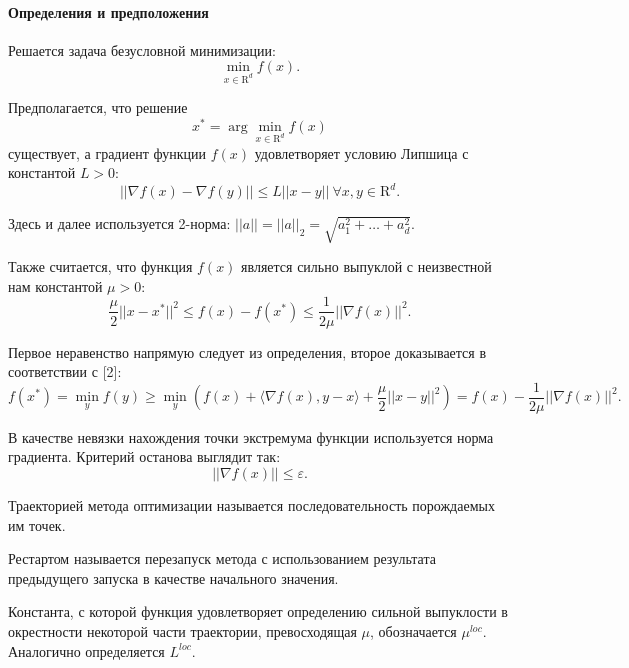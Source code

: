 \documentclass{crm-article}
\begin{document}
\paragraph{Определения и предположения}

Решается задача безусловной минимизации:
\begin{equation}
\min_{x\in \mathrm{R}^d} f(x).
\end{equation}

Предполагается, что решение
\begin{equation}
x^*=\arg\min_{x\in \mathrm{R}^d} f(x)
\end{equation}
существует, а градиент функции $f(x)$ удовлетворяет условию Липшица с константой $L>0$:
\begin{equation}
||\nabla f(x) - \nabla f(y)||\leq L||x-y||\ \forall x,y\in \mathrm{R}^d.
\end{equation}

Здесь и далее используется 2-норма: $||a||=||a||_2=\sqrt{a_1^2+\ldots+a_d^2}.$

Также считается, что функция $f(x)$ является сильно выпуклой с неизвестной нам константой $\mu>0$:
\begin{equation}
\frac{\mu}{2}||x-x^*||^2\leq f(x)-f(x^*)\leq \frac{1}{2\mu}||\nabla f(x)||^2.
\end{equation}


Первое неравенство напрямую следует из определения, второе доказывается в соответствии с [2]:
$$f(x^*) = \min_{y} f(y)\geq \min_y \left(f(x) + \langle \nabla f(x), y-x\rangle + \dfrac{\mu}{2} ||x-y||^2\right) = f(x) - \dfrac{1}{2\mu} ||\nabla f(x)||^2.$$

В качестве невязки нахождения точки экстремума функции используется норма градиента. Критерий останова выглядит так:
\begin{equation}
||\nabla f(x)||\leq\varepsilon.
\end{equation}

Траекторией метода оптимизации называется последовательность порождаемых им точек.

Рестартом называется перезапуск метода с использованием
результата предыдущего запуска в качестве начального значения.

Константа, с которой функция удовлетворяет определению сильной выпуклости в окрестности некоторой части траектории, превосходящая $\mu$, обозначается $\mu^{loc}$. Аналогично определяется $L^{loc}$.
\end{document}
